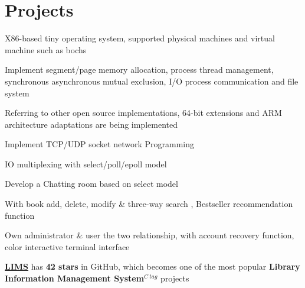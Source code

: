 \documentclass[]{deedy-resume-openfont}
\begin{document}
\begin{minipage}[t]{0.73\textwidth} 


\section{Projects}
\sectionsep
{}
\vspace{\topsep}
\begin{tightemize}
    \item X86-based tiny operating system, supported physical machines and virtual machine such as bochs
    \item Implement segment/page memory allocation, process thread management, synchronous asynchronous mutual exclusion, I/O process communication and file system
    \item Referring to other open source implementations, 64-bit extensions and ARM architecture adaptations are being implemented
    \end{tightemize}
\sectionsep

\begin{tightemize}
    \item Implement TCP/UDP socket network Programming
    \item IO multiplexing with select/poll/epoll model
    \item Develop a Chatting room based on select model
    \end{tightemize}
\sectionsep

\begin{tightemize}
    \item With book add, delete, modify \& three-way search , Bestseller recommendation function
    \item Own administrator \& user the two relationship, with account recovery function, color interactive terminal interface
    \item \href{https://github.com/fuujiro/LIMS}{\bf LIMS} has \textbf{42 stars} in GitHub, which becomes one of the most popular \textbf{Library Information Management System}$^{C \ tag}$ projects
    \end{tightemize}
\sectionsep


\end{minipage}
\end{document}
